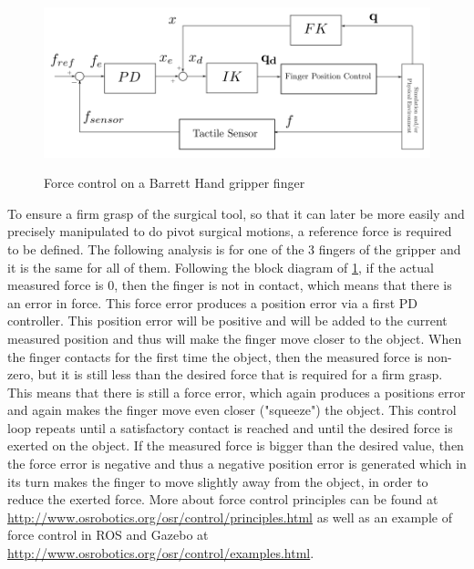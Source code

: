 \begin{center}
\begin{figure}[!htb]
\centering
\includegraphics[width=12cm]{images/finger-force-control.png}\\
\caption{Force control on a Barrett Hand gripper finger}
\label{finger-force-control}
\end{figure}
\end{center}

To ensure a firm grasp of the surgical tool, so that it can later be more easily and precisely manipulated to do pivot surgical motions, a reference force is required to be defined. The following analysis is 
for one of the 3 fingers of the gripper and it is the same for all of them. Following the block diagram of \ref{finger-force-control}, if the actual measured force is 0, then the finger is not in contact, which means that 
there is an error in force. This force error produces a position error via a first PD controller. This position error will be positive and will be added to the current measured position and thus will make the finger move 
closer to the object. When the finger contacts for the first time the object, then the measured force is non-zero, 
but it is still less than the desired force that is required for a firm grasp. This means that there is still a force error, which again produces a positions error and again makes the finger move even closer ("squeeze") the 
object. This control loop repeats until a satisfactory contact is reached and until the desired force is exerted on the object. If the measured force is bigger than the desired value, then the force error is negative and thus
a negative position error is generated which in its turn makes the finger to move slightly away from the object, in order to reduce the exerted force. More about force control principles can be found at 
\url{http://www.osrobotics.org/osr/control/principles.html} as well as an example of force control in ROS and Gazebo at \url{http://www.osrobotics.org/osr/control/examples.html}.